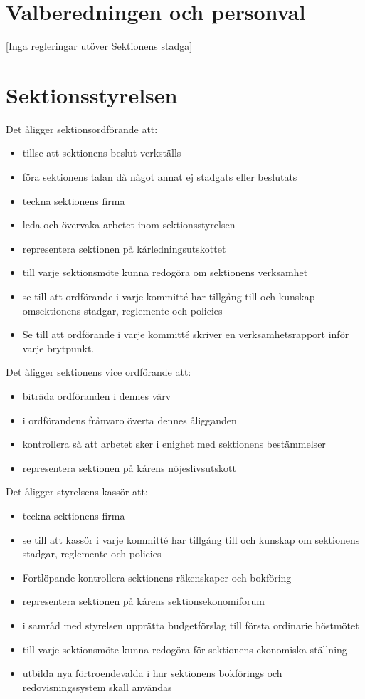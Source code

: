 \documentclass[a4paper]{dteklag}
\begin{document}
\section{Valberedningen och personval}
\begin{center}
  [Inga regleringar utöver Sektionens stadga]
\end{center}
\section{Sektionsstyrelsen}
\para Det åligger sektionsordförande att:
\begin{itemize}
  \item tillse att sektionens beslut verkställs
  \item föra sektionens talan då något annat ej stadgats eller beslutats
  \item teckna sektionens firma
  \item leda och övervaka arbetet inom sektionsstyrelsen
  \item representera sektionen på kårledningsutskottet
  \item till varje sektionsmöte kunna redogöra om sektionens verksamhet
  \item se till att ordförande i varje kommitté har tillgång till och kunskap omsektionens stadgar, reglemente och policies
  \item Se till att ordförande i varje kommitté skriver en verksamhetsrapport inför varje brytpunkt.
\end{itemize}
\para Det åligger sektionens vice ordförande att:
\begin{itemize}
  \item biträda ordföranden i dennes värv
  \item i ordförandens frånvaro överta dennes åligganden
  \item kontrollera så att arbetet sker i enighet med sektionens bestämmelser
  \item representera sektionen på kårens nöjeslivsutskott
\end{itemize}
\para Det åligger styrelsens kassör att:
\begin{itemize}
  \item teckna sektionens firma
  \item se till att kassör i varje kommitté har tillgång till och kunskap om sektionens stadgar, reglemente och policies
  \item Fortlöpande kontrollera sektionens räkenskaper och bokföring
  \item representera sektionen på kårens sektionsekonomiforum
  \item i samråd med styrelsen upprätta budgetförslag till första ordinarie höstmötet
  \item till varje sektionsmöte kunna redogöra för sektionens ekonomiska ställning
  \item utbilda nya förtroendevalda i hur sektionens bokförings och redovisningssystem skall användas
\end{itemize}
\end{document}
